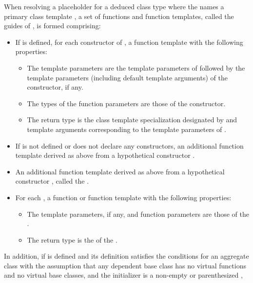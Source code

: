 \pnum
When resolving a placeholder for a deduced class type
where the  names a primary class template ,
a set of functions and function templates, called the guides of ,
is formed comprising:
\begin{itemize}
\item
If  is defined,
for each constructor of ,
a function template with the following properties:
\begin{itemize}
\item
The template parameters are the template parameters of 
followed
by the template parameters (including default template arguments) of the constructor,
if any.
\item
The types of the function parameters are those of the constructor.
\item
The return type is the class template specialization
designated by 
and template arguments
corresponding to the template parameters of .
\end{itemize}

\item
If 
is not defined or does not declare any constructors,
an additional function template derived as above
from a hypothetical constructor .

\item
An additional function template derived as above
from a hypothetical constructor ,
called the .

\item
For each ,
a function or function template
with the following properties:

\begin{itemize}
\item
The template parameters, if any,
and function parameters
are those of the .
\item
The return type
is the 
of the .
\end{itemize}
\end{itemize}
In addition, if  is defined
and its definition satisfies the conditions for
an aggregate class
with the assumption that any dependent base class has
no virtual functions and no virtual base classes, and
the initializer is a non-empty  or
parenthesized ,
